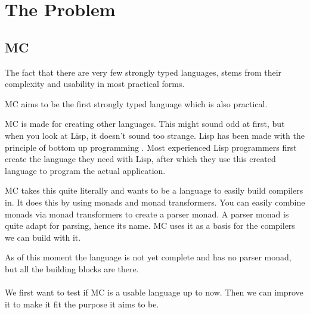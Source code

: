 \section{The Problem}

\subsection{MC}
The fact that there are very few strongly typed languages, stems from their complexity and usability in most practical forms.

MC aims to be the first strongly typed language which is also practical.

MC is made for creating other languages.
This might sound odd at first, but when you look at Lisp, it doesn't sound too strange.
Lisp has been made with the principle of bottom up programming \cite{graham1994lisp}.
Most experienced Lisp programmers first create the language they need with Lisp, after which they use this created language to program the actual application.

MC takes this quite literally and wants to be a language to easily build compilers in.
It does this by using monads and monad transformers.
You can easily combine monads via monad transformers to create a parser monad.
A parser monad is quite adapt for parsing, hence its name.
MC uses it as a basis for the compilers we can build with it.

As of this moment the language is not yet complete and has no parser monad, but all the building blocks are there.

\paragraph{}
We first want to test if MC is a usable language up to now. Then we can improve it to make it fit the purpose it aims to be.
